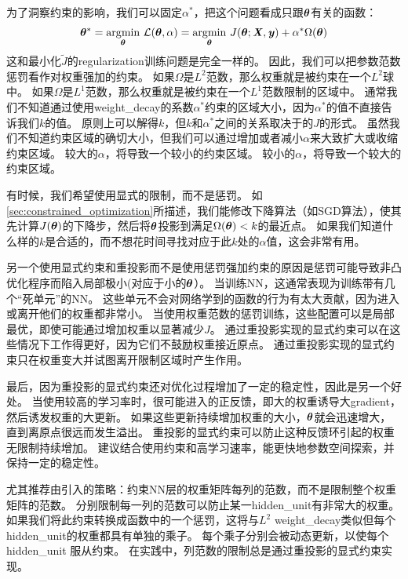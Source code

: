 为了洞察约束的影响，我们可以固定$\alpha^*$，把这个问题看成只跟$\boldsymbol{\theta}$有关的函数：
\begin{align}
 \boldsymbol{\theta}^* =  \underset{\boldsymbol{\theta}}{ \arg\!\min} ~\mathcal{L}(\boldsymbol{\theta}, \alpha) = 
 \underset{\boldsymbol{\theta}}{ \arg\!\min}~
 J(\boldsymbol{\theta}; \boldsymbol{\mathit{X}}, \boldsymbol{\mathit{y}}) + \alpha^* \Omega(\boldsymbol{\theta})
\end{align}
这和最小化$\tilde J$的\gls{regularization}训练问题是完全一样的。
因此，我们可以把参数范数惩罚看作对权重强加的约束。
如果$\Omega$是$L^2$范数，那么权重就是被约束在一个$L^2$球中。
如果$\Omega$是$L^1$范数，那么权重就是被约束在一个$L^1$范数限制的区域中。
通常我们不知道通过使用\gls{weight_decay}的系数$\alpha^*$约束的区域大小，因为$\alpha^*$的值不直接告诉我们$k$的值。
原则上可以解得$k$，但$k$和$\alpha^*$之间的关系取决于的$J$的形式。
虽然我们不知道约束区域的确切大小，但我们可以通过增加或者减小$\alpha$来大致扩大或收缩约束区域。
较大的$\alpha$，将导致一个较小的约束区域。
较小的$\alpha$，将导致一个较大的约束区域。


有时候，我们希望使用显式的限制，而不是惩罚。
如\ref{sec:constrained_optimization}所描述，我们能修改下降算法（如\gls{SGD}算法），使其先计算$J(\boldsymbol{\theta})$的下降步，然后将$\boldsymbol{\theta}$投影到满足$\Omega(\boldsymbol{\theta}) < k$的最近点。
如果我们知道什么样的$k$是合适的，而不想花时间寻找对应于此$k$处的$\alpha$值，这会非常有用。

另一个使用显式约束和重投影而不是使用惩罚强加约束的原因是惩罚可能导致非凸优化程序而陷入局部极小(对应于小的$\boldsymbol{\theta}$）。
当训练\gls{NN}，这通常表现为训练带有几个``死单元''的\gls{NN}。
这些单元不会对网络学到的函数的行为有太大贡献，因为进入或离开他们的权重都非常小。
当使用权重范数的惩罚训练，这些配置可以是局部最优，即使可能通过增加权重以显著减少$J$。
通过重投影实现的显式约束可以在这些情况下工作得更好，因为它们不鼓励权重接近原点。
通过重投影实现的显式约束只在权重变大并试图离开限制区域时产生作用。

最后，因为重投影的显式约束还对优化过程增加了一定的稳定性，因此是另一个好处。
当使用较高的学习率时，很可能进入的正反馈，即大的权重诱导大\gls{gradient}，然后诱发权重的大更新。
如果这些更新持续增加权重的大小，$\boldsymbol{\theta}$就会迅速增大，直到离原点很远而发生溢出。
重投影的显式约束可以防止这种反馈环引起的权重无限制持续增加。
\cite{Hinton-et-al-arxiv2012}建议结合使用约束和高学习速率，能更快地参数空间探索，并保持一定的稳定性。


\cite{Hinton-et-al-arxiv2012}尤其推荐由\cite{Srebro05}引入的策略：约束\gls{NN}层的权重矩阵每列的范数，而不是限制整个权重矩阵的范数。
分别限制每一列的范数可以防止某一\gls{hidden_unit}有非常大的权重。
如果我们将此约束转换成函数中的一个惩罚，这将与$L^2$ \gls{weight_decay}类似但每个\gls{hidden_unit}的权重都具有单独的乘子。
每个乘子分别会被动态更新，以使每个\gls{hidden_unit} 服从约束。
在实践中，列范数的限制总是通过重投影的显式约束实现。

